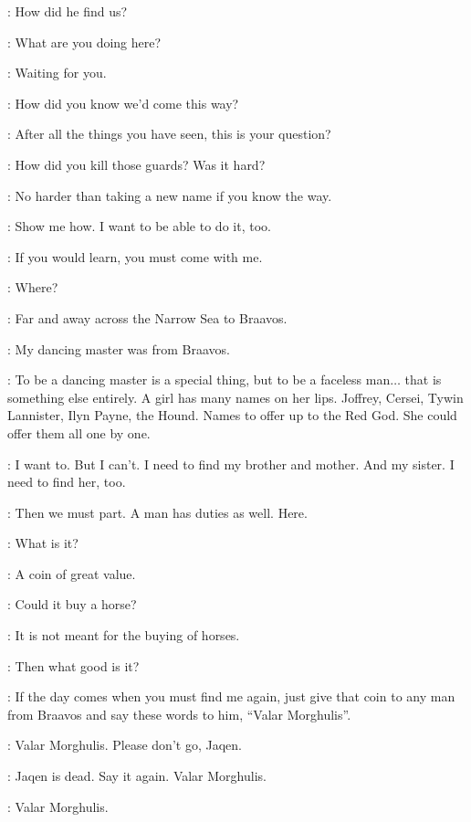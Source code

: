 \GENDRY: How did he find us? 


\ARYA: What are you doing here? 

\JAQEN: Waiting for you. 

\ARYA: How did you know we'd come this way? 

\JAQEN: After all the things you have seen, this is your question? 

\ARYA: How did you kill those guards? Was it hard? 

\JAQEN: No harder than taking a new name if you know the way. 

\ARYA: Show me how. I want to be able to do it, too. 

\JAQEN: If you would learn, you must come with me. 

\ARYA: Where? 

\JAQEN: Far and away across the Narrow Sea to Braavos. 

\ARYA: My dancing master was from Braavos. 

\JAQEN: To be a dancing master is a special thing, but to be a faceless man$\ldots$ that is something else entirely. A girl has many names on her lips.  Joffrey, Cersei, Tywin Lannister, Ilyn Payne, the Hound. Names to offer up to the Red God. She could offer them all one by one. 

\ARYA: I want to. But I can't. I need to find my brother and mother. And my sister. I need to find her, too. 

\JAQEN: Then we must part. A man has duties as well. Here. 

\ARYA: What is it? 

\JAQEN: A coin of great value. 

\ARYA:  Could it buy a horse? 

\JAQEN: It is not meant for the buying of horses. 

\ARYA: Then what good is it? 

\JAQEN: If the day comes when you must find me again, just give that coin to any man from Braavos and say these words to him, ``Valar Morghulis''. 

\ARYA: Valar Morghulis.  Please don't go, Jaqen. 

\JAQEN: Jaqen is dead. Say it again. Valar Morghulis. 

\ARYA: Valar Morghulis. 

